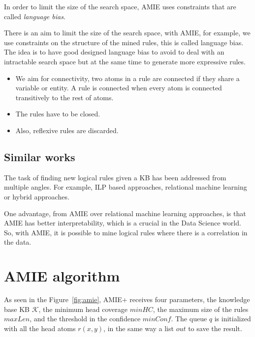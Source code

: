 \documentclass{article}
\begin{document}
In order to limit the size of the search space, AMIE uses constraints that are called
\textit{language bias}.


There is an aim to limit the size of the search space, with AMIE, for example,
we use constraints on the structure of the mined rules, this is called language
bias. The idea is to have good designed language bias to avoid to deal with an
intractable search space but at the same time to generate more expressive rules.

\begin{itemize}
    \item We aim for connectivity, two atoms in a rule are connected if they share a variable or
entity. A rule is connected when every atom is connected transitively to the
rest of atoms.
    \item The rules have to be closed.
    \item Also, reflexive rules are discarded.
\end{itemize}

\subsection{Similar works}

The task of finding new logical rules given a KB has been addressed from
multiple angles. For example, ILP based approaches, relational machine learning
or hybrid approaches.

One advantage, from AMIE over relational machine learning approaches, is that
AMIE has better interpretability, which is a crucial in the Data Science world.
So, with AMIE, it is possible to mine logical rules where there is a
correlation in the data.

\section{AMIE algorithm}


As seen in the Figure~\ref{fig:amie}, AMIE+ receives four parameters,
the knowledge base KB $\mathcal{K}$, the minimum head coverage $minHC$, the
maximum size of the rules $maxLen$, and the threshold in the confidence
$minConf$. The queue $q$ is initialized  with all the head atoms $r(x,y)$, in
the same way a list $out$ to save the result.
\end{document}
